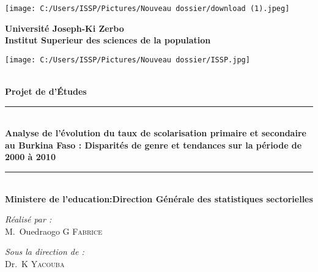 \documentclass[a4paper,12pt]{report}
\begin{document}
\begin{titlepage}
\begin{center}
	\begin{minipage}{2.5cm}
	\begin{center}
		\texttt{[image: C:/Users/ISSP/Pictures/Nouveau dossier/download (1).jpeg]}
		
	\end{center}
\end{minipage}\hfill
\begin{minipage}{10cm}
	\begin{center}
	\textbf{ Université Joseph-Ki Zerbo}\\[0.1cm]
    \textbf{\uppercase{I}nstitut Superieur des sciences de la population}\\[0.1cm]

	\end{center}
\end{minipage}\hfill
\begin{minipage}{2.5cm}
	\begin{center}
		\texttt{[image: C:/Users/ISSP/Pictures/Nouveau dossier/ISSP.jpg]}
	\end{center}

\end{minipage}

\textsc{\Large }\\[1.5cm]
{\large \bfseries  Projet de  d'\uppercase{é}tudes}\\[0.5cm]
\rule{\linewidth}{0.3mm} \\[0.4cm]
{ \huge \bfseries\color{blue!70!black} Analyse de l'évolution du taux de scolarisation primaire et secondaire au Burkina Faso : Disparités de genre et tendances sur la période de 2000 à 2010 \\[0.4cm] }
\rule{\linewidth}{0.3mm} \\[1cm]
{\large \bfseries Ministere de l'education:Direction Générale des statistiques sectorielles }\\[1cm]


\noindent
\begin{minipage}{0.4\textwidth}
  \begin{flushleft} \large
    \emph{\color{orange!80!black}Réalisé par :}\\
    M.~Ouedraogo \textsc{G Fabrice}\\
  \end{flushleft}
\end{minipage}%
\begin{minipage}{0.5\textwidth}
  \begin{flushright} \large
    \emph{\color{orange!80!black}Sous la direction de :} \\
    Dr.~K \textsc{Yacouba}
  \end{flushright}
\end{minipage}\\[1cm]


\end{center}
\end{titlepage}
\end{document}

